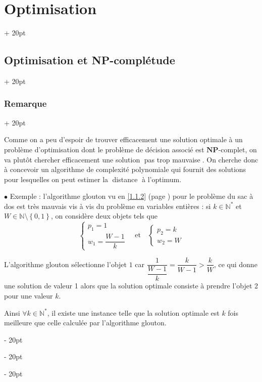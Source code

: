 \documentclass[a4paper, 12pt, twoside]{article}
\newcommand{\N}{\mathbb{N}} %
\newcommand{\set}[1]{\left\{ #1 \right\}}
\newcommand{\simplecit}[1]{\guillemotleft$\;$#1$\;$\guillemotright}
\newcommand{\ind}[1][20pt]{\advance\leftskip + #1}
\newcommand{\deind}[1][20pt]{\advance\leftskip - #1}
\newenvironment{indt}[2][20pt]{#2 \par \ind[#1]}{\par \deind} %
\newcommand{\1}{\mathbbm 1}
\begin{document}
\begin{indt}{\section{Optimisation}}
\begin{indt}{\subsection{Optimisation et \textbf{NP}-complétude}}
            \vspace{12pt}
            
            \begin{indt}{\subsubsection{Remarque}}
                \label{1.2.3}

                Comme on a peu d'espoir de trouver efficacement une solution optimale à un problème d'optimisation dont le problème de décision associé est $\mathbf{NP}$-complet, on va plutôt chercher efficacement une solution \simplecit{pas trop mauvaise}.
                On cherche donc à concevoir un algorithme de complexité polynomiale qui fournit des solutions pour lesquelles on peut estimer la \simplecit{distance} à l'optimum.

                \vspace{12pt}
                
                $\bullet$ Exemple : l'algorithme glouton vu en \ref{1.1.2} (page \pageref{1.1.2}) pour le problème du sac à dos est très mauvais vis à vis du problème en variables entières : si $k \in \N^*$ et $W \in \N \setminus \set{0, 1}$, on considère deux objets tels que
                \[
                    \begin{cases}
                        p_1 = 1
                        \\
                        w_1 = \dfrac{W - 1}{k}
                    \end{cases}
                    \quad
                    \text{et}
                    \quad
                    \begin{cases}
                        p_2 = k
                        \\
                        w_2 = W
                    \end{cases}
                \]

                L'algorithme glouton sélectionne l'objet $1$ car $\dfrac{1}{\dfrac{W - 1}{k}}  = \dfrac{k}{W - 1} > \dfrac k W$, ce qui donne une solution de valeur 1 alors que la solution optimale consiste à prendre l'objet 2 pour une valeur $k$.

                Ainsi $\forall k \in \N^*$, il existe une instance telle que la solution optimale est $k$ fois meilleure que celle calculée par l'algorithme glouton.

                \vspace{12pt}
                

\end{indt}
\end{indt}
\end{indt}
\end{document}
